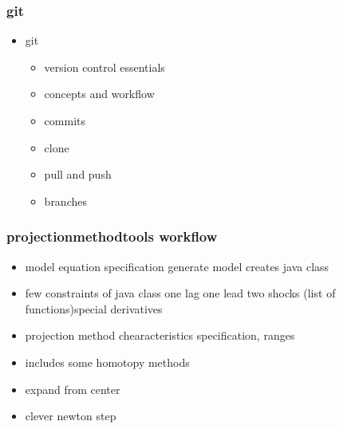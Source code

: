 \documentclass[handout]{beamer}
\begin{document}



















\begin{frame}
  \frametitle{git}
  \begin{itemize}
  \item git
    \begin{itemize}
    \item version control essentials
    \item concepts and workflow
    \item commits
    \item clone
    \item pull and push
    \item branches
    \end{itemize}
  \end{itemize}
\end{frame}






\begin{frame}
  \frametitle{projectionmethodtools workflow}
  \begin{itemize}
  \item model equation specification generate model creates java class
  \item few constraints of java class  one lag one lead two shocks (list of functions)special derivatives
  \item projection method chearacteristics specification, ranges
    \item includes some homotopy methods
    \item expand from center
    \item clever newton step
  \end{itemize}
\end{frame}
\end{document}
